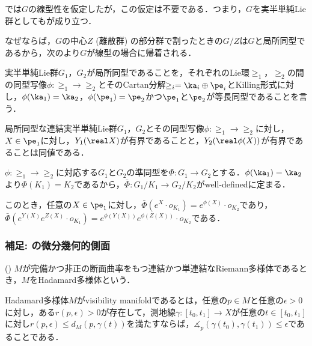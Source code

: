 \begin{rem}
  では$G$の線型性を仮定したが，この仮定は不要である．つまり，$G$を実半単純Lie群としてもが成り立つ．

  なぜならば，$G$の中心$Z$ (離散群) の部分群で割ったときの$G/Z$は$G$と局所同型であるから，次のより$G$が線型の場合に帰着される．

  \begin{defi}
    実半単純Lie群$G_1$，$G_2$が局所同型であることを，それぞれのLie環$\ge_1$，$\ge_2$の間の同型写像$\phi\colon \ge_1\to \ge_2$とそのCartan分解$\ge_i = \ka_i\oplus \pe_i $とKilling形式に対し，$\phi(\ka_1) = \ka_2 $，$\phi(\pe_1) = \pe_2 $かつ$\pe_1$と$\pe_2$が等長同型であることを言う．
  \end{defi}

  \begin{lem}\label{lem:loc-isom}
    局所同型な連結実半単純Lie群$G_1$，$G_2$とその同型写像$\phi\colon \ge_1\to \ge_2$に対し，$X\in \pe_1$に対し，$Y_1(\real X) $が有界であることと，$Y_2(\real \phi(X)) $が有界であることは同値である．
  \end{lem}
  \begin{npfwn}{}
    $\phi\colon \ge_1\to \ge_2$に対応する$G_1$と$G_2$の準同型を$\Phi\colon G_1\to G_2$とする．$\phi(\ka_1) = \ka_2 $より$\Phi(K_1) = K_2 $であるから，$\bar{\Phi}\colon G_1/K_1\to G_2/K_2 $がwell-definedに定まる．

    このとき，任意の$X\in \pe_1$に対し，$\bar{\Phi}(e^X\cdot o_{K_1}) = e^{\phi(X)}\cdot o_{K_2} $であり，$\bar{\Phi}(e^{Y(X)}e^{Z(X)}\cdot o_{K_1}) = e^{\phi(Y(X))}e^{\phi(Z(X))}\cdot o_{K_2} $である．
  \end{npfwn}
\end{rem}


\subsubsection{補足: の微分幾何的側面}
\begin{defi}({\cite[Definition~1.3]{e72-1}})\label{def:visibility}
  $M$が完備かつ非正の断面曲率をもつ連結かつ単連結なRiemann多様体であるとき，$M$をHadamard多様体という．

  Hadamard多様体$M$がvisibility manifoldであるとは，任意の$ p\in M$と任意の$ \epsilon > 0$に対し，ある$r(p,\epsilon) >0 $が存在して，測地線$\gamma\colon [t_0, t_1]\to X $が任意の$ t\in [t_0, t_1]$に対し$r(p,\epsilon) \leq d_{M}(p, \gamma(t))$を満たすならば，$\measuredangle_{p}(\gamma(t_0), \gamma(t_1)) \leq \epsilon $であることである．
\end{defi}

